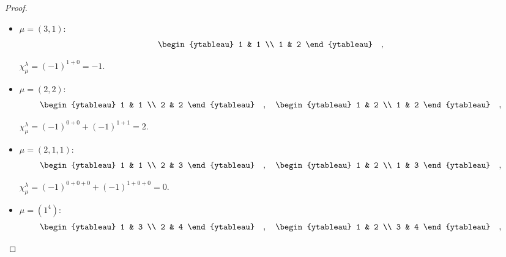 \documentclass[8pt]{extarticle}
\newcommand{\<}{\langle}
\renewcommand{\>}{\rangle}
\theoremstyle{definition}
\begin{document}
\begin{proof}
\begin{itemize}
\begin{itemize}
    \item
      $\mu = (3,1)$:
      \begin{align*}
        \begin{ytableau}
          1 & 1 \\
          1 & 2
        \end{ytableau}\quad,\quad
      \end{align*}
      
      $\chi_{\mu}^{\lambda} = (-1)^{1+0} = -1$.

    \item
      $\mu = (2,2)$:
      \begin{align*}
        \begin{ytableau}
          1 & 1 \\
          2 & 2 
        \end{ytableau}\quad,\quad
        \begin{ytableau}
          1 & 2 \\
          1 & 2 
        \end{ytableau}\quad,\quad        
      \end{align*}

      $\chi_{\mu}^{\lambda} = (-1)^{0 + 0} + (-1)^{1 + 1} = 2$.

    \item
      $\mu = (2,1,1)$:
      \begin{align*}
        \begin{ytableau}
          1 & 1 \\
          2 & 3 
        \end{ytableau}\quad,\quad
        \begin{ytableau}
          1 & 2 \\
          1 & 3 
        \end{ytableau}\quad,\quad        
      \end{align*}
      
      $\chi_{\mu}^{\lambda} = (-1)^{0 + 0 + 0} + (-1)^{1 + 0 + 0} = 0$.

    \item
      $\mu = (1^4)$:
      \begin{align*}
        \begin{ytableau}
          1 & 3 \\
          2 & 4 
        \end{ytableau}\quad,\quad
        \begin{ytableau}
          1 & 2 \\
          3 & 4 
        \end{ytableau}\quad,\quad
      \end{align*}
      

\end{itemize}
\end{itemize}
\end{proof}
\end{document}
